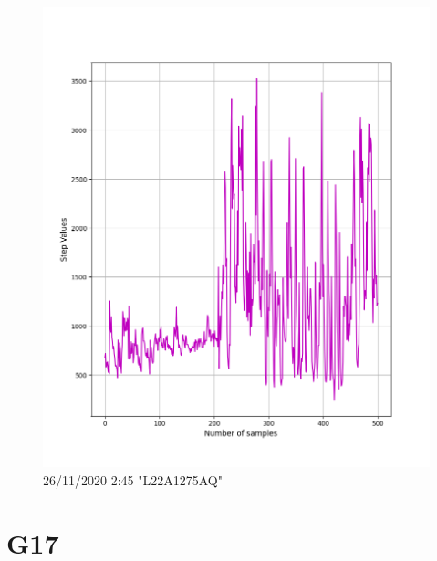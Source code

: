 \documentclass[hidelinks, 12pt, a4paper]{article}
\begin{document}
\begin{figure}[h!]
\centering
	\includegraphics[height=.38\textheight, width=\textwidth]{assets/session1/g16.png}
    \caption{26/11/2020 2:45 "L22A1275AQ"}
\end{figure}

\section{G17}
\end{document}
